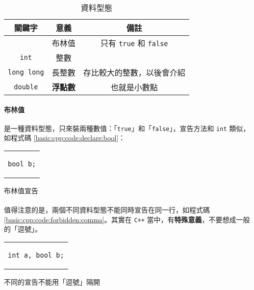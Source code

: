 \documentclass[12pt,a4paper,oneside]{report}
\begin{document}
\begin{CJK}{UTF8}{bkai}
\begin{table}[h!]
\centering
\begin{tabular}{|c|c|c|}
\hline
\textbf{關鍵字} & \textbf{意義} & \textbf{備註}\\
\hline
\hline
\index{資料型態!布林值}{\lstinline!bool!} & 布林值 & 只有 \lstinline!true! 和 \lstinline!false!\\
\hline
\lstinline!int! & 整數 &\\
\hline
\lstinline!long long! & 長整數 & 存比較大的整數，以後會介紹\\
\hline
\lstinline!double!    & \textbf{浮點數} & 也就是小數點\\
\hline
\end{tabular}
\caption{資料型態}
\label{basic:cpp:table:primitive:type}
\end{table}

\paragraph{布林值}是一種資料型態，只來裝兩種數值：「\lstinline!true!」和「\lstinline!false!」，宣告方法和 \lstinline!int! 類似，如程式碼 \ref{basic:cpp:code:declare:bool}：

\begin{code}[h!]
\centering
\begin{tabular}{c}
\begin{lstlisting}
bool b;
\end{lstlisting}
\end{tabular}
\caption{布林值宣告}
\label{basic:cpp:code:declare:bool}
\end{code}

\paragraph{}值得注意的是，兩個不同資料型態不能同時宣告在同一行，如程式碼 \ref{basic:cpp:code:forbidden:comma}。其實在 \texttt{C++} 當中，有\textbf{特殊意義}，不要想成一般的「逗號」。

\begin{code}[h!]
\centering
\begin{tabular}{c}
\begin{lstlisting}
int a, bool b;
\end{lstlisting}
\end{tabular}
\caption{不同的宣告不能用「逗號」隔開}
\label{basic:cpp:code:forbidden:comma}
\end{code}


\end{CJK}
\end{document}
